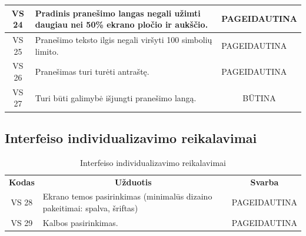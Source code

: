 \documentclass{VUMIFPSkursinis}
\begin{document}
\begin{center}
\begin{table}[H]
\begin{tabular}{|p{2cm}|p{11cm}|p{2cm}|}
	\hline
		\multicolumn{1}{|c|}{VS 24}&
		\multicolumn{1}{|p{12,5cm}|}{Pradinis pranešimo langas negali užimti daugiau nei 50\% ekrano pločio ir aukščio.}& 
		\multicolumn{1}{|p{1.5cm}|}{PAGEIDAUTINA}\\
	\hline
		\multicolumn{1}{|c|}{VS 25}&
		\multicolumn{1}{|p{12,5cm}|}{Pranešimo teksto ilgis negali viršyti 100 simbolių limito.}& 
		\multicolumn{1}{|p{1.5cm}|}{PAGEIDAUTINA}\\
	\hline
		\multicolumn{1}{|c|}{VS 26}&
		\multicolumn{1}{|p{12,5cm}|}{Pranešimas turi turėti antraštę.}& 
		\multicolumn{1}{|p{1.5cm}|}{PAGEIDAUTINA}\\
	\hline
		\multicolumn{1}{|c|}{VS 27}&
		\multicolumn{1}{|p{12,5cm}|}{Turi būti galimybė išjungti pranešimo langą.}& 
		\multicolumn{1}{|c|}{BŪTINA}\\
	\hline	 	
	
	\end{tabular}
	
	\label{table:5}
	\end{table}

\end{center}

\pagebreak

\subsection{Interfeiso individualizavimo reikalavimai}

\begin{center}
	\begin{table}[H]
	\caption{Interfeiso individualizavimo reikalavimai}
	\begin{tabular}{|p{2cm}|p{13cm}|p{2cm}|}
	\hline
	    \rowcolor{lightgray}
	    \multicolumn{3}{|c|}{Interfeiso individualizavimo reikalavimai}\\
	\hline
		\multicolumn{1}{|c|}{ {\bfseries Kodas}}&
		\multicolumn{1}{|c|}{ {\bfseries Užduotis}}&
		\multicolumn{1}{|c|}{{\bfseries Svarba}}\\		
	\hline
		\multicolumn{1}{|c|}{VS 28}&
		\multicolumn{1}{|p{12,9cm}|}{Ekrano temos pasirinkimas (minimalūs dizaino pakeitimai: spalva, šriftas)}& 
		\multicolumn{1}{|p{1.5cm}|}{PAGEIDAUTINA}\\
	\hline
		\multicolumn{1}{|c|}{VS 29}&
		\multicolumn{1}{|p{12,9cm}|}{Kalbos pasirinkimas.}& 
		\multicolumn{1}{|p{1.5cm}|}{PAGEIDAUTINA}\\
	\hline
	
	\end{tabular}
	
	\label{table:6}	
	\end{table}
\end{center}
\end{document}
